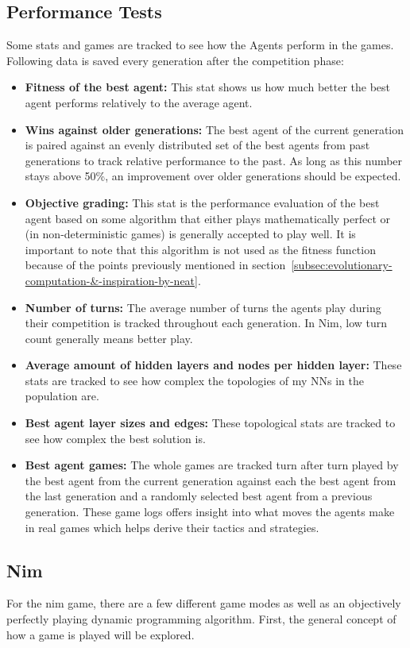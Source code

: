 \subsection{Performance Tests}\label{subsec:performance-tests}
Some stats and games are tracked to see how the Agents perform in the games.
Following data is saved every generation after the competition phase:
\begin{itemize}
    \item \textbf{Fitness of the best agent:} This stat shows us how much better the best agent performs relatively to the average agent.
    \item \textbf{Wins against older generations:} The best agent of the current generation is paired against an evenly distributed set of the best agents from past generations to track relative performance to the past.
    As long as this number stays above 50\%, an improvement over older generations should be expected.
    \item \textbf{Objective grading:} This stat is the performance evaluation of the best agent based on some algorithm that either plays mathematically perfect or (in non-deterministic games) is generally accepted to play well.
    It is important to note that this algorithm is not used as the fitness function because of the points previously mentioned in section~\ref{subsec:evolutionary-computation-&-inspiration-by-neat}.
    \item \textbf{Number of turns:} The average number of turns the agents play during their competition is tracked throughout each generation.
    In Nim, low turn count generally means better play.
    \item \textbf{Average amount of hidden layers and nodes per hidden layer:} These stats are tracked to see how complex the topologies of my NNs in the population are.
    \item \textbf{Best agent layer sizes and edges:} These topological stats are tracked to see how complex the best solution is.
    \item \textbf{Best agent games:} The whole games are tracked turn after turn played by the best agent from the current generation against each the best agent from the last generation and a randomly selected best agent from a previous generation.
    These game logs offers insight into what moves the agents make in real games which helps derive their tactics and strategies.
\end{itemize}

\subsection{Nim}\label{subsec:nim-implementation}
For the nim game, there are a few different game modes as well as an objectively perfectly playing dynamic programming algorithm.
First, the general concept of how a game is played will be explored.

